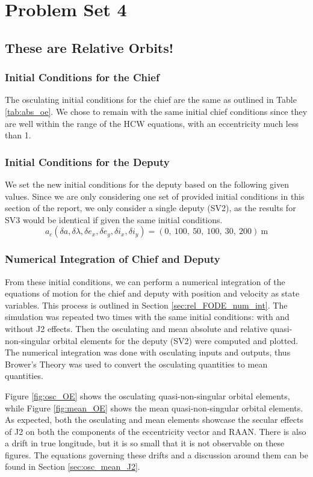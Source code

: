 \section{Problem Set 4}
\subsection{These are Relative Orbits!}

\subsubsection{Initial Conditions for the Chief} 
The osculating initial conditions for the chief are the same as outlined in Table \ref{tab:abs_oe}. We chose to remain with the same initial chief conditions since they are well within the range of the HCW equations, with an eccentricity much less than 1. 

\subsubsection{Initial Conditions for the Deputy} \label{sec:ic_for_pset4}

We set the new initial conditions for the deputy based on the following given values. Since we are only considering one set of provided initial conditions in this section of the report, we only consider a single deputy (SV2), as the results for SV3 would be identical if given the same initial conditions.
\[
a_c (\delta a, \delta \lambda, \delta e_x, \delta e_y, \delta i_x, \delta i_y) = (0,\ 100,\ 50,\ 100,\ 30,\ 200)~\text{m}
\]

\subsubsection{Numerical Integration of Chief and Deputy}
From these initial conditions, we can perform a numerical integration of the equations of motion for the chief and deputy with position and velocity as state variables. This process is outlined in Section \ref{sec:rel_FODE_num_int}. The simulation was repeated two times with the same initial conditions: with and without J2 effects. Then the osculating and mean absolute and relative quasi-non-singular orbital elements for the deputy (SV2) were computed and plotted. The numerical integration was done with osculating inputs and outputs, thus Brower's Theory was used to convert the osculating quantities to mean quantities. 

Figure \ref{fig:osc_OE} shows the osculating quasi-non-singular orbital elements, while Figure \ref{fig:mean_OE} shows the mean quasi-non-singular orbital elements. As expected, both the osculating and mean elements showcase the secular effects of J2 on both the components of the eccentricity vector and RAAN. There is also a drift in true longitude, but it is so small that it is not observable on these figures. The equations governing these drifts and a discussion around them can be found in Section \ref{sec:osc_mean_J2}.

